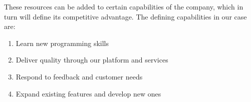 These resources can be added to certain capabilities of the company, which in turn will define its competitive advantage. The defining capabilities in our case are:

\begin{enumerate}
  \item Learn new programming skills
  \item Deliver quality through our platform and services
  \item Respond to feedback and customer needs
  \item Expand existing features and develop new ones
\end{enumerate}